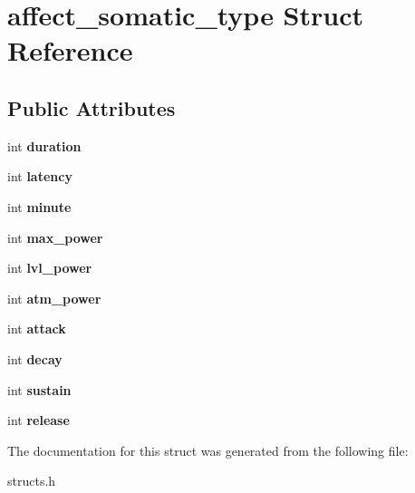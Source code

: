 \hypertarget{structaffect__somatic__type}{\section{affect\-\_\-somatic\-\_\-type Struct Reference}
\label{structaffect__somatic__type}
}
\subsection*{Public Attributes}
\begin{DoxyCompactItemize}
\item 
\hypertarget{structaffect__somatic__type_aee016558f55f5fe0a773abe53560047e}{int {\bfseries duration}}\label{structaffect__somatic__type_aee016558f55f5fe0a773abe53560047e}

\item 
\hypertarget{structaffect__somatic__type_a12cc96a1664328193285d2abca98e710}{int {\bfseries latency}}\label{structaffect__somatic__type_a12cc96a1664328193285d2abca98e710}

\item 
\hypertarget{structaffect__somatic__type_adaf58207c1b56a0e8823036841c1419f}{int {\bfseries minute}}\label{structaffect__somatic__type_adaf58207c1b56a0e8823036841c1419f}

\item 
\hypertarget{structaffect__somatic__type_acb822cbd55a806e6a8b6f4bb6fcc21fa}{int {\bfseries max\-\_\-power}}\label{structaffect__somatic__type_acb822cbd55a806e6a8b6f4bb6fcc21fa}

\item 
\hypertarget{structaffect__somatic__type_abb1467170e16a1517a074614c1d86991}{int {\bfseries lvl\-\_\-power}}\label{structaffect__somatic__type_abb1467170e16a1517a074614c1d86991}

\item 
\hypertarget{structaffect__somatic__type_ac1f92f8401a14b8273e6fca0c423d1b3}{int {\bfseries atm\-\_\-power}}\label{structaffect__somatic__type_ac1f92f8401a14b8273e6fca0c423d1b3}

\item 
\hypertarget{structaffect__somatic__type_ae49070ec3647f8d4f1c628686d71256b}{int {\bfseries attack}}\label{structaffect__somatic__type_ae49070ec3647f8d4f1c628686d71256b}

\item 
\hypertarget{structaffect__somatic__type_a94413a57fd94c620d6d97014fba3222e}{int {\bfseries decay}}\label{structaffect__somatic__type_a94413a57fd94c620d6d97014fba3222e}

\item 
\hypertarget{structaffect__somatic__type_ae41a284f123fac114c48d18c95a036ae}{int {\bfseries sustain}}\label{structaffect__somatic__type_ae41a284f123fac114c48d18c95a036ae}

\item 
\hypertarget{structaffect__somatic__type_a97e8678e479146a2d5d793d54ca919b4}{int {\bfseries release}}\label{structaffect__somatic__type_a97e8678e479146a2d5d793d54ca919b4}

\end{DoxyCompactItemize}


The documentation for this struct was generated from the following file\-:\begin{DoxyCompactItemize}
\item 
structs.\-h\end{DoxyCompactItemize}
